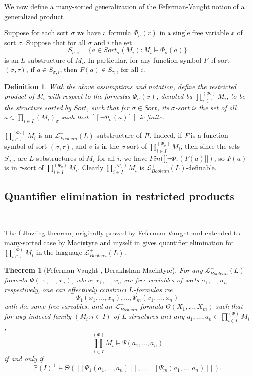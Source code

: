 \documentclass[12pt]{amsart}
\def\P{\mathbb{P}}
\def\cL{\mathcal{L}}
\def\cL{\mathcal{L}}
\newtheorem{thm}{Theorem}[section]
\newtheorem{Def}{Definition}[section]
\numberwithin{equation}{section}
\begin{document}
We now define a many-sorted generalization of the Feferman-Vaught notion of a generalized product. 

Suppose for each sort $\sigma$ we have a formula $\Phi_{\sigma}(x)$ in a 
single free variable $x$ of sort $\sigma$. Suppose that for all $\sigma$ and $i$ the set 
$$S_{\sigma,i}=\{a\in Sort_{\sigma}(M_i): M_i\models \Phi_{\sigma}(a)\}$$
is an $L$-substructure of $M_i$.  In particular, for any function symbol $F$ of sort $(\sigma,\tau)$, if 
$a\in S_{\sigma,i}$, then $F(a)\in S_{\tau,i}$
for all $i$.

\begin{Def} With the above assumptions and notation, define the restricted product of $M_i$ with respect to the formulas $\Phi_{\sigma}(x)$, denoted by $\prod_{i\in I}^{(\Phi_{\sigma})} M_i$, 
to be the structure sorted by $Sort$, such that for $\sigma\in Sort$, its $\sigma$-sort 
is the set of all $a\in \prod_{i\in I} (M_i)_{\sigma}$ such that $[[\neg \Phi_{\sigma}(a)]]$ is finite.\end{Def}

$\prod_{i\in I}^{(\Phi_{\sigma})} M_i$ is an $\cL_{Boolean}^{+}(L)$-substructure of $\Pi$. Indeed, if $F$ is a function symbol of sort $(\sigma,\tau)$,
and $a$ is in the $\sigma$-sort of $\prod_{i\in I}^{(\Phi_{\sigma})} M_i$, then since the sets $S_{\sigma,i}$ are 
$L$-substructures of $M_i$ for all 
$i$, we have $Fin([[\neg \Phi_{\tau}(F(a)]])$, so $F(a)$ is in $\tau$-sort of $\prod_{i\in I}^{(\Phi_{\sigma})} M_i$. Clearly $\prod_{i\in I}^{(\Phi_{\sigma})} M_i$ is $\cL_{Boolean}^{+}(L)$-definable. 

\medskip

\subsection{\bf Quantifier elimination in restricted products}\label{ssec-qe} 

\

\medskip

The following theorem, originally proved by Feferman-Vaught and extended to many-sorted case by Macintyre and myself 
in \cite{DM-supp} gives quantifier elimination for $\prod^{(\Phi)}_{i\in I} M_i$ in the language $\cL_{Boolean}^{+}(L)$.
\begin{thm}[Feferman-Vaught \cite{FV}, Derakhshan-Macintyre\cite{DM-supp}]\label{restricted-qe} 
For any $\cL_{Boolean}^{+}(L)$-formula $\Psi(x_1,\dots,x_n)$, where $x_1,\dots,x_n$ are free 
variables of sorts $\sigma_1,\dots,\sigma_n$ respectively, one can effectively construct 
$L$-formulas ree 
$$\Psi_1(x_1,\dots,x_n),\dots,\Psi_m(x_1,\dots,x_n)$$
with the same free variables, 
and an $\cL_{Boolean}^+$-formula $\Theta(X_1,\dots,X_m)$ 
such that for any indexed family $(M_i: i\in I)$ of $L$-structures and any $a_1,\dots,a_n\in \prod^{(\Phi)}_{i\in I} M_i$, 
$$\prod^{(\Phi)}_{i\in I} M_i\models \Psi(a_1,\dots,a_n)$$ if and only if 
$$\P(I)^+\models \Theta([[\Psi_1(a_1,\dots,a_n)]],\dots,[[\Psi_m(a_1,\dots,a_n)]]).$$
\end{thm}
\end{document}
